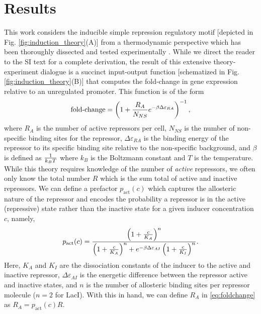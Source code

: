 \section{Results}
This work considers the inducible simple repression regulatory motif
[depicted in Fig. \ref{fig:induction_theory}(A)] from a thermodynamic
perspective which has been thoroughly dissected and tested experimentally
\cite{Garcia2011, Brewster2014, Razo-Mejia2018}. While we direct the reader
to the SI text for a complete derivation, the result of this extensive
theory-experiment dialogue is a succinct input-output function [schematized
in Fig. \ref{fig:induction_theory}(B)] that computes the fold-change in gene
expression relative to an unregulated promoter. This function is of the form
\begin{equation}
\text{fold-change} = \left(1 + {R_A \over
N_{NS}}e^{-\beta\Delta\varepsilon_{RA}}\right)^{-1},
\label{eq:foldchange}
\end{equation}
where $R_A$ is the number of active repressors per cell, $N_{NS}$ is the
number of non-specific binding sites for the repressor,
$\Delta\varepsilon_{RA}$ is the binding energy of the repressor
to its specific binding site relative to the non-specific background, and
$\beta$ is defined as ${1 \over k_B T}$ where $k_B$ is the Boltzmann constant
and $T$ is the temperature. While this theory requires knowledge of the number
of \textit{active} repressors, we often only know the total number $R$
which is the sum total of active and inactive repressors. We can define a
prefactor $p_\text{act}(c)$ which captures the
allosteric nature of the repressor and encodes the probability a
repressor is in the active (repressive) state rather than the inactive state
for a given inducer concentration $c$, namely,
\begin{equation}
p_\text{act}(c) = {\left(1 + {c \over K_A}\right)^n \over \left(1 + {c \over
K_A}\right)^n + e^{-\beta\Delta\varepsilon_{AI}}\left(1 + {c \over
K_I}\right)^n}.
\label{eq:pact}
\end{equation}
Here, $K_A$ and $K_I$ are the dissociation constants of the inducer to the
active and inactive repressor, $\Delta\varepsilon_{AI}$ is the energetic
difference between the repressor active and inactive states, and $n$ is the number of
allosteric binding sites per repressor molecule ($n=2$ for LacI). With this in
hand, we can define $R_A$ in \eqref{eq:foldchange} as $R_A = p_\text{act}(c)
R$.

